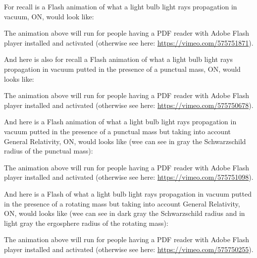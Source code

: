 	For recall is a Flash animation of what a light bulb light rays propagation in vacuum, ON, would look like:
	\begin{center}
	\centering
	\end{center}
	The animation above will run for people having a PDF reader with Adobe Flash player installed and activated (otherwise see here: \url{https://vimeo.com/575751871}).
	
	And here is also for recall a Flash animation of what a light bulb light rays propagation in vacuum putted in the presence of a punctual mass, ON, would looks like:
	\begin{center}
	\centering
	\end{center}
	The animation above will run for people having a PDF reader with Adobe Flash player installed and activated (otherwise see here: \url{https://vimeo.com/575750678}).
	
	And here is a Flash animation of what a light bulb light rays propagation in vacuum putted in the presence of a punctual mass but taking into account General Relativity, ON, would looks like (wee can see in gray the Schwarzschild radius of the punctual mass):
	\begin{center}
	\centering
	\end{center}
	The animation above will run for people having a PDF reader with Adobe Flash player installed and activated (otherwise see here: \url{https://vimeo.com/575751098}).
	
	And here is a Flash of what a light bulb light rays propagation in vacuum putted in the presence of a rotating mass but taking into account General Relativity, ON, would looks like (wee can see in dark gray the Schwarzschild radius and in light gray the ergosphere radius of the rotating mass):
	\begin{center}
	\centering
	\end{center}
	The animation above will run for people having a PDF reader with Adobe Flash player installed and activated (otherwise see here: \url{https://vimeo.com/575750255}).
	
